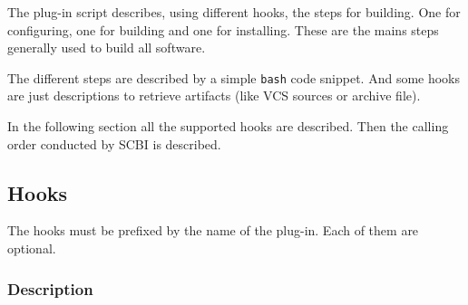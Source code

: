 \documentclass[a4paper,12pt,twoside]{article}
\newcommand{\code}[1]{\texttt{#1}}
\begin{document}
The plug-in script describes, using different hooks, the steps for building. One for configuring, one for building and one for installing. These are the mains steps generally used to build all software.

The different steps are described by a simple \code{bash} code snippet. And some hooks are just descriptions to retrieve artifacts (like VCS sources or archive file).

In the following section all the supported hooks are described. Then the calling order conducted by SCBI is described.

\subsection{Hooks}

The hooks must be prefixed by the name of the plug-in. Each of them are optional.

\subsubsection{Description}
\end{document}
